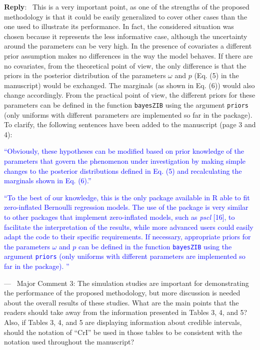 \documentclass[11pt]{article}
\newcounter{reviewer}
\newcounter{point}[reviewer]
\renewcommand{\thepoint}{C\,\arabic{point}}
\newenvironment{point}
   {\refstepcounter{point} \bigskip \noindent {\textbf{Reviewer~Comment~\thepoint} } ---\ }
   {\par }
\newenvironment{reply}
   {\medskip \noindent \begin{sf}\textbf{Reply}:\  }
   {\medskip \end{sf}}
\begin{document}
\begin{reply}
This is a very important point, as one of the strengths of the proposed methodology is that it could be easily generalized to cover other cases than the one used to illustrate its performance. In fact, the considered situation was chosen because it represents the less informative case, although the uncertainty around the parameters can be very high. In the presence of covariates a different prior assumption makes no differences in the way the model behaves. If there are no covariates, from the theoretical point of view, the only difference is that the priors in the posterior distribution of the parameters $\omega$ and $p$ (Eq. (5) in the manuscript) would be exchanged. The marginals (as shown in Eq. (6)) would also change accordingly. From the practical point of view, the different priors for these parameters can be defined in the function \texttt{bayesZIB} using the argument \texttt{priors} (only uniforms with different parameters are implemented so far in the package). To clarify, the following sentences have been added to the manuscript (page 3 and 4):

\textcolor{blue}{``Obviously, these hypotheses can be modified based on prior knowledge of the parameters that govern the phenomenon under investigation by making simple changes to the posterior distributions defined in Eq. (5) and recalculating the marginals shown in Eq. (6).''}

\textcolor{blue}{``To the best of our knowledge, this is the only package available in R able to fit zero-inflated Bernoulli regression models. The use of the package is very similar to other packages that implement zero-inflated models, such as \textit{pscl} [16], to facilitate the interpretation of the results, while more advanced users could easily adapt the code to their specific requirements. If necessary, appropriate priors for the parameters $\omega$ and $p$ can be defined in the function \texttt{bayesZIB} using the argument \texttt{priors} (only uniforms with different parameters are implemented so far in the package). ''}

\end{reply}

\begin{point}
Major Comment 3: The simulation studies are important for demonstrating the performance of the proposed methodology, but more discussion is needed about the overall results of these studies. What are the main points that the readers should take away from the information presented in Tables 3, 4, and 5? Also, if Tables 3, 4, and 5 are displaying information about credible intervals, should the notation of ``CrI'' be used in those tables to be consistent with the notation used throughout the manuscript?
	\label{pt:C4}
\end{point}
\end{document}
